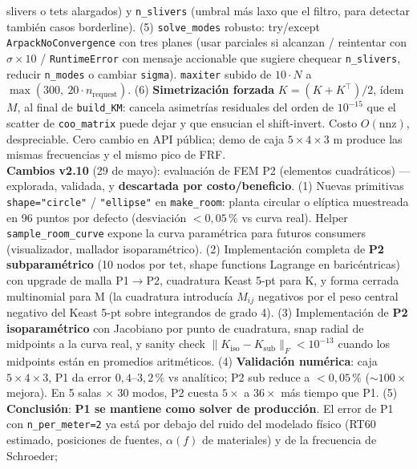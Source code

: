 \documentclass[11pt, a4paper]{article}
\begin{document}
\begin{center}
{    slivers o tets alargados) y \texttt{n\_slivers} (umbral más laxo
    que el filtro, para detectar también casos borderline).
    (5) \texttt{solve\_modes} robusto: try/except
    \texttt{ArpackNoConvergence} con tres planes
    (usar parciales si alcanzan / reintentar con $\sigma\times 10$ /
    \texttt{RuntimeError} con mensaje accionable que sugiere
    chequear \texttt{n\_slivers}, reducir \texttt{n\_modes} o cambiar
    \texttt{sigma}). \texttt{maxiter} subido de
    $10\cdot N$ a $\max(300,\ 20 \cdot n_\text{request})$.
    (6) \textbf{Simetrización forzada}
    $K = (K + K^\top)/2$, ídem $M$, al final de \texttt{build\_KM}:
    cancela asimetrías residuales del orden de $10^{-15}$ que el
    scatter de \texttt{coo\_matrix} puede dejar y que ensucian el
    shift-invert. Costo $O(\text{nnz})$, despreciable.
    Cero cambio en API pública; demo de caja $5\times 4\times 3$ m
    produce las mismas frecuencias y el mismo pico de FRF.\\[2pt]
    \textbf{Cambios v2.10} (29 de mayo): evaluación de FEM P2 (elementos
    cuadráticos) --- explorada, validada, y \textbf{descartada por
    costo/beneficio}.
    (1) Nuevas primitivas \texttt{shape="circle"} / \texttt{"ellipse"} en
    \texttt{make\_room}: planta circular o elíptica muestreada en 96
    puntos por defecto (desviación $<0{,}05\,\%$ vs curva real).
    Helper \texttt{sample\_room\_curve} expone la curva paramétrica para
    futuros consumers (visualizador, mallador isoparamétrico).
    (2) Implementación completa de \textbf{P2 subparamétrico} (10 nodos
    por tet, shape functions Lagrange en baricéntricas) con upgrade de
    malla P1$\to$P2, cuadratura Keast 5-pt para K, y forma cerrada
    multinomial para M (la cuadratura introducía $M_{ij}$ negativos por
    el peso central negativo del Keast 5-pt sobre integrandos de grado 4).
    (3) Implementación de \textbf{P2 isoparamétrico} con Jacobiano por
    punto de cuadratura, snap radial de midpoints a la curva real, y
    sanity check $\|K_\text{iso} - K_\text{sub}\|_F < 10^{-13}$ cuando
    los midpoints están en promedios aritméticos.
    (4) \textbf{Validación numérica}: caja $5\times 4\times 3$, P1 da
    error $0{,}4$--$3{,}2\,\%$ vs analítico; P2 sub reduce a $<0{,}05\,\%$
    ($\sim 100\times$ mejora). En 5 salas $\times$ 30 modos, P2 cuesta
    $5\times$ a $36\times$ más tiempo que P1.
    (5) \textbf{Conclusión}: \textbf{P1 se mantiene como solver de
    producción}. El error de P1 con \texttt{n\_per\_meter=2} ya está
    por debajo del ruido del modelado físico (RT60 estimado, posiciones
    de fuentes, $\alpha(f)$ de materiales) y de la frecuencia de Schroeder;
}
\end{center}
\end{document}
